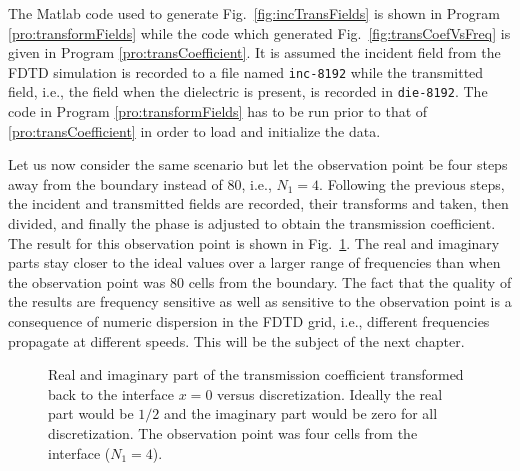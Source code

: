 The Matlab code used to generate Fig.\ \ref{fig:incTransFields} is
shown in Program \ref{pro:transformFields} while the code which
generated Fig.\ \ref{fig:transCoefVsFreq} is given in Program
\ref{pro:transCoefficient}.  It is assumed the incident field from the
FDTD simulation is recorded to a file named {\tt inc-8192} while the
transmitted field, i.e., the field when the dielectric is present, is
recorded in {\tt die-8192}.  The code in Program
\ref{pro:transformFields} has to be run prior to that of 
\ref{pro:transCoefficient} in order to load and initialize the data.

Let us now consider the same scenario but let the observation point be
four steps away from the boundary instead of $80$, i.e., $N_1=4$.
Following the previous steps, the incident and transmitted fields are
recorded, their transforms and taken, then divided, and finally the
phase is adjusted to obtain the transmission coefficient.  The result
for this observation point is shown in Fig.\
\ref{fig:transCoefVsFreqX4}.  The real and imaginary parts stay closer
to the ideal values over a larger range of frequencies than when the
observation point was $80$ cells from the boundary.  The fact that the
quality of the results are frequency sensitive as well as sensitive to
the observation point is a consequence of numeric dispersion in the
FDTD grid, i.e., different frequencies propagate at different speeds.
This will be the subject of the next chapter.
\begin{figure}
  \begin{center}
  \end{center}

  \caption{Real and imaginary part of the transmission coefficient
    transformed back to the interface $x=0$ versus discretization.
    Ideally the real part would be $1/2$ and the imaginary part would
    be zero for all discretization.  The observation point was four
    cells from the interface ($N_1 = 4$).}
   \label{fig:transCoefVsFreqX4}
\end{figure}


